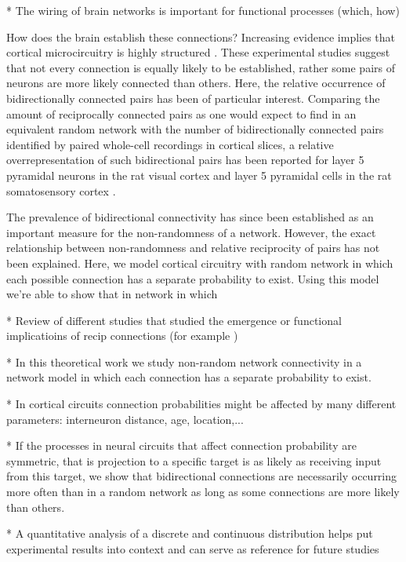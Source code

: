 
* The wiring of brain networks is important for functional processes (which, how)

How does the brain establish these connections? Increasing evidence implies that cortical microcircuitry is highly structured \cite{Song2005,Perin2011}. These experimental studies suggest that not every connection is equally likely to be established, rather some pairs of neurons are more likely connected than others. Here, the relative occurrence of bidirectionally connected pairs has been of particular interest. Comparing the amount of reciprocally connected pairs as one would expect to find in an equivalent random network with the number of bidirectionally connected pairs identified by paired whole-cell recordings in cortical slices, a relative overrepresentation of such bidirectional pairs has been reported for layer 5 pyramidal neurons in the rat visual cortex \cite{Song2005} and layer 5 pyramidal cells in the rat somatosensory cortex \cite{Markram1997,Perin2011}.

The prevalence of bidirectional connectivity has since been established as an important measure for the non-randomness of a network. However, the exact relationship between non-randomness and relative reciprocity of pairs has not been explained. Here, we model cortical circuitry with random network in which each possible connection has a separate probability to exist. Using this model we're able to show that in network in which 


* Review of different studies that studied the emergence or functional implicatioins of recip connections (for example \cite{Clopath2010})

* In this theoretical work we study non-random network connectivity in a network model in which each connection has a separate probability to exist.

* In cortical circuits connection probabilities might be affected by many different parameters: interneuron distance, age, location,...

* If the processes in neural circuits that affect connection probability are symmetric, that is projection to a specific target is as likely as receiving input from this target, we show that bidirectional connections are necessarily occurring more often than in a random network as long as some connections are more likely than others.



* A quantitative analysis of a discrete and continuous distribution helps put experimental results into context and can serve as reference for future studies



